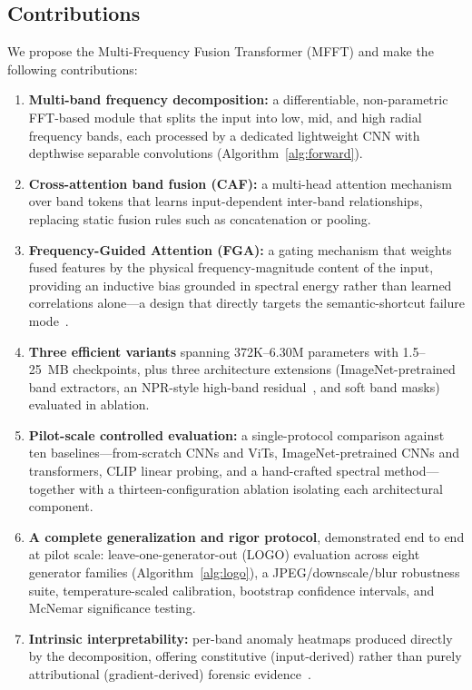 \documentclass[journal]{IEEEtran}
\begin{document}
\subsection{Contributions}
We propose the Multi-Frequency Fusion Transformer (MFFT) and make the following contributions:
\begin{enumerate}
    \item \textbf{Multi-band frequency decomposition:} a differentiable, non-parametric FFT-based module that splits the input into low, mid, and high radial frequency bands, each processed by a dedicated lightweight CNN with depthwise separable convolutions (Algorithm~\ref{alg:forward}).
    \item \textbf{Cross-attention band fusion (CAF):} a multi-head attention mechanism over band tokens that learns input-dependent inter-band relationships, replacing static fusion rules such as concatenation or pooling.
    \item \textbf{Frequency-Guided Attention (FGA):} a gating mechanism that weights fused features by the physical frequency-magnitude content of the input, providing an inductive bias grounded in spectral energy rather than learned correlations alone---a design that directly targets the semantic-shortcut failure mode~\cite{shuai2026shortcuts}.
    \item \textbf{Three efficient variants} spanning 372K--6.30M parameters with 1.5--25~MB checkpoints, plus three architecture extensions (ImageNet-pretrained band extractors, an NPR-style high-band residual~\cite{tan2024npr}, and soft band masks) evaluated in ablation.
    \item \textbf{Pilot-scale controlled evaluation:} a single-protocol comparison against ten baselines---from-scratch CNNs and ViTs, ImageNet-pretrained CNNs and transformers, CLIP linear probing, and a hand-crafted spectral method---together with a thirteen-configuration ablation isolating each architectural component.
    \item \textbf{A complete generalization and rigor protocol}, demonstrated end to end at pilot scale: leave-one-generator-out (LOGO) evaluation across eight generator families (Algorithm~\ref{alg:logo}), a JPEG/downscale/blur robustness suite, temperature-scaled calibration, bootstrap confidence intervals, and McNemar significance testing.
    \item \textbf{Intrinsic interpretability:} per-band anomaly heatmaps produced directly by the decomposition, offering constitutive (input-derived) rather than purely attributional (gradient-derived) forensic evidence~\cite{selvaraju2017}.
\end{enumerate}
\end{document}
